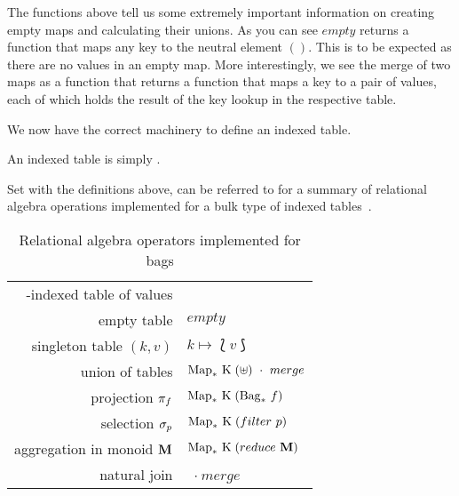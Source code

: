 The functions above tell us some extremely important information on creating
empty maps and calculating their unions. As you can see $empty$ returns a
function that maps any key to the neutral element $()$. This is to be expected
as there are no values in an empty map. More interestingly, we see the merge
of two maps as a function that returns a function that maps a key to a pair of
values, each of which holds the result of the key lookup in the respective
table.

We now have the correct machinery to define an indexed table.

\begin{indexedtabledef}
    An indexed table \indexedTable{\keyset}{\valset} is simply .
\end{indexedtabledef}

Set with the definitions above,  can be referred
to for a summary of relational algebra operations implemented for a bulk type of
indexed tables~\cite{RelationalAlgebraByWayOfAdjunctions}.

\begin{table}[h]
    \centering
    \begin{tabular}{r|l}
        \keyset{}-indexed table of \valset{} values & \indexedTable{\keyset}{\valset} \\
        empty table & $empty$ \\
        singleton table $(k, v)$ & $k \mapsto \lbag v \rbag$ \\
        union of tables & $\finitemap{\keyset}{(\uplus)}\ \cdot\ merge$ \\
        projection $\pi_{f}$ & $\mathrm{Map}_*\ \mathrm{K}\;(\mathrm{Bag}_*\ f)$ \\
        selection $\sigma_{p}$ & $\mathrm{Map}_*\ \mathrm{K}\;(filter\ p)$ \\
        aggregation in monoid $\mathrm{\textbf{M}}$ & $\mathrm{Map}_*\ \mathrm{K}\;(reduce\
        \mathrm{\textbf{M}})$\\
            natural join & \finitemap{\keyset}{(\times)}\ $\cdot\ merge$ \\
    \end{tabular}
    \caption{Relational algebra operators implemented for bags}
    \label{tab:BagRelAlgOps}
\end{table}
